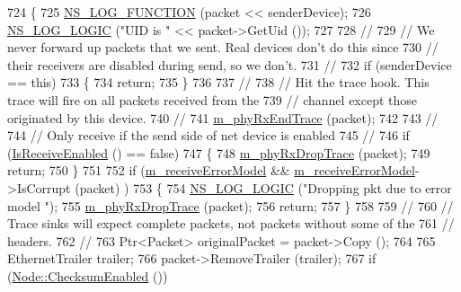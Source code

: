 \begin{DoxyCode}
724 \{
725   \hyperlink{log-macros-disabled_8h_a90b90d5bad1f39cb1b64923ea94c0761}{NS\_LOG\_FUNCTION} (packet << senderDevice);
726   \hyperlink{group__logging_ga88acd260151caf2db9c0fc84997f45ce}{NS\_LOG\_LOGIC} (\textcolor{stringliteral}{"UID is "} << packet->GetUid ());
727 
728   \textcolor{comment}{//}
729   \textcolor{comment}{// We never forward up packets that we sent.  Real devices don't do this since}
730   \textcolor{comment}{// their receivers are disabled during send, so we don't.}
731   \textcolor{comment}{// }
732   \textcolor{keywordflow}{if} (senderDevice == \textcolor{keyword}{this})
733     \{
734       \textcolor{keywordflow}{return};
735     \}
736 
737   \textcolor{comment}{//}
738   \textcolor{comment}{// Hit the trace hook.  This trace will fire on all packets received from the}
739   \textcolor{comment}{// channel except those originated by this device.}
740   \textcolor{comment}{//}
741   \hyperlink{classns3_1_1CsmaNetDevice_afe2bac4b10c5d73f78e11668a3e6a679}{m\_phyRxEndTrace} (packet);
742 
743   \textcolor{comment}{// }
744   \textcolor{comment}{// Only receive if the send side of net device is enabled}
745   \textcolor{comment}{//}
746   \textcolor{keywordflow}{if} (\hyperlink{classns3_1_1CsmaNetDevice_a6a4e8e37d1a78fa176184a1787b47c3a}{IsReceiveEnabled} () == \textcolor{keyword}{false})
747     \{
748       \hyperlink{classns3_1_1CsmaNetDevice_a9413b693a3028dcccb20f653bad58bc0}{m\_phyRxDropTrace} (packet);
749       \textcolor{keywordflow}{return};
750     \}
751 
752   \textcolor{keywordflow}{if} (\hyperlink{classns3_1_1CsmaNetDevice_aeef9196f9c7c46c99a7f703dc46c0207}{m\_receiveErrorModel} && \hyperlink{classns3_1_1CsmaNetDevice_aeef9196f9c7c46c99a7f703dc46c0207}{m\_receiveErrorModel}->IsCorrupt (packet) 
      )
753     \{
754       \hyperlink{group__logging_ga88acd260151caf2db9c0fc84997f45ce}{NS\_LOG\_LOGIC} (\textcolor{stringliteral}{"Dropping pkt due to error model "});
755       \hyperlink{classns3_1_1CsmaNetDevice_a9413b693a3028dcccb20f653bad58bc0}{m\_phyRxDropTrace} (packet);
756       \textcolor{keywordflow}{return};
757     \}
758 
759   \textcolor{comment}{//}
760   \textcolor{comment}{// Trace sinks will expect complete packets, not packets without some of the}
761   \textcolor{comment}{// headers.}
762   \textcolor{comment}{//}
763   Ptr<Packet> originalPacket = packet->Copy ();
764 
765   EthernetTrailer trailer;
766   packet->RemoveTrailer (trailer);
767   \textcolor{keywordflow}{if} (\hyperlink{classns3_1_1Node_a0515bfe9a3aeb6605d657ba855699815}{Node::ChecksumEnabled} ())

\end{DoxyCode}
